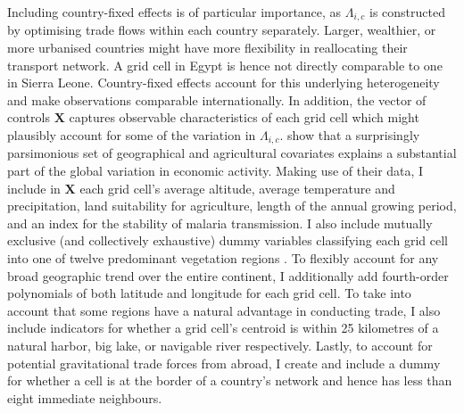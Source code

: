 \documentclass[11pt, oneside]{article}   	%
\begin{document}
Including country-fixed effects is of particular importance, as $\Lambda_{i,c}$ is constructed by optimising trade flows within each country separately. Larger, wealthier, or more urbanised countries might have more flexibility in reallocating their transport network. A grid cell in Egypt is hence not directly comparable to one in Sierra Leone.  Country-fixed effects account for this underlying heterogeneity and make observations comparable internationally. In addition, the vector of controls $\textbf{X}$ captures observable characteristics of each grid cell which might plausibly account for some of the variation in $\Lambda_{i,c}$. \cite{henderson_global_2018} show that a surprisingly parsimonious set of geographical and agricultural covariates explains a substantial part of the global variation in economic activity. Making use of their data, I include in $\textbf{X}$ each grid cell's average altitude, average temperature and precipitation, land suitability for agriculture, length of the annual growing period, and an index for the stability of malaria transmission. I also include mutually exclusive (and collectively exhaustive) dummy variables classifying each grid cell into one of twelve predominant vegetation regions \citep[or \emph{Biomes}, see][]{henderson_global_2018}. To flexibly account for any broad geographic trend over the entire continent, I additionally add fourth-order polynomials of both latitude and longitude for each grid cell. To take into account that some regions have a natural advantage in conducting trade, I also include indicators for whether a grid cell's centroid is within 25 kilometres of a natural harbor, big lake, or navigable river respectively. Lastly, to account for potential gravitational trade forces from abroad, I create and include a dummy for whether a cell is at the border of a country's network and hence has less than eight immediate neighbours.
\end{document}
